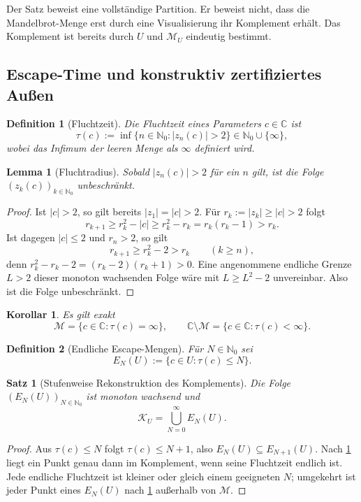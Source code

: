 \documentclass[11pt,a4paper]{article}
\newtheorem{definition}{Definition}[section]
\newtheorem{satz}{Satz}[section]
\newtheorem{lemma}{Lemma}[section]
\newtheorem{korollar}{Korollar}[section]
\theoremstyle{remark}
\newcommand{\M}{\mathcal{M}}
\newcommand{\K}{\mathcal{K}}
\newcommand{\C}{\mathbb{C}}
\newcommand{\N}{\mathbb{N}}
\begin{document}
Der Satz beweist eine vollständige Partition. Er beweist nicht, dass die
Mandelbrot-Menge erst durch eine Visualisierung ihr Komplement erhält. Das
Komplement ist bereits durch \(U\) und \(\M_U\) eindeutig bestimmt.

\subsection{Escape-Time und konstruktiv zertifiziertes Außen}

\begin{definition}[Fluchtzeit]
Die Fluchtzeit eines Parameters \(c\in\C\) ist
\[
  \tau(c)
  :=
  \inf\{n\in\N_0:|z_n(c)|>2\}
  \in\N_0\cup\{\infty\},
\]
wobei das Infimum der leeren Menge als \(\infty\) definiert wird.
\end{definition}

\begin{lemma}[Fluchtradius]
\label{lemma:escape}
Sobald \(|z_n(c)|>2\) für ein \(n\) gilt, ist die Folge
\((z_k(c))_{k\in\N_0}\) unbeschränkt.
\end{lemma}

\begin{proof}
Ist \(|c|>2\), so gilt bereits \(|z_1|=|c|>2\). Für
\(r_k:=|z_k|\ge |c|>2\) folgt
\[
  r_{k+1}\ge r_k^2-|c|\ge r_k^2-r_k=r_k(r_k-1)>r_k.
\]
Ist dagegen \(|c|\le 2\) und \(r_n>2\), so gilt
\[
  r_{k+1}\ge r_k^2-2>r_k
  \qquad(k\ge n),
\]
denn \(r_k^2-r_k-2=(r_k-2)(r_k+1)>0\). Eine angenommene
endliche Grenze \(L>2\) dieser monoton wachsenden Folge wäre mit
\(L\ge L^2-2\) unvereinbar. Also ist die Folge unbeschränkt.
\end{proof}

\begin{korollar}
\label{kor:escape}
Es gilt exakt
\[
  \M=\{c\in\C:\tau(c)=\infty\},
  \qquad
  \C\setminus\M=\{c\in\C:\tau(c)<\infty\}.
\]
\end{korollar}

\begin{definition}[Endliche Escape-Mengen]
Für \(N\in\N_0\) sei
\[
  E_N(U):=\{c\in U:\tau(c)\le N\}.
\]
\end{definition}

\begin{satz}[Stufenweise Rekonstruktion des Komplements]
\label{satz:escape-union}
Die Folge \((E_N(U))_{N\in\N_0}\) ist monoton wachsend und
\[
  \K_U=\bigcup_{N=0}^{\infty}E_N(U).
\]
\end{satz}

\begin{proof}
Aus \(\tau(c)\le N\) folgt \(\tau(c)\le N+1\), also
\(E_N(U)\subseteq E_{N+1}(U)\). Nach \cref{kor:escape} liegt ein Punkt genau
dann im Komplement, wenn seine Fluchtzeit endlich ist. Jede endliche
Fluchtzeit ist kleiner oder gleich einem geeigneten \(N\); umgekehrt ist jeder
Punkt eines \(E_N(U)\) nach \cref{lemma:escape} außerhalb von \(\M\).
\end{proof}
\end{document}
